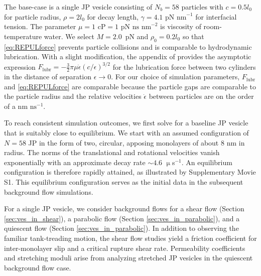 \documentclass[lineno]{jfm}
\begin{document}
The base-case is a single JP vesicle consisting of $N_b = 58$ particles
with $c = 0.5 l_0$ for particle radius, $\rho = 2 l_0$ for decay length,
$\gamma = \text{4.1 pN nm}^{-1}$ for interfacial tension.
The parameter $\mu = \text{1 cP} = \text{1 pN
ns nm}^{-2}$ is viscosity of room-temperature water. 
We select $M=2.0$~$\text{pN}$ and $\rho_0 = 0.2l_0$ so that \eqref{eq:REPULforce}
  prevents particle collisions and is comparable to hydrodynamic lubrication.
  With a slight modification, the appendix of
  \cite{cawthorn_balmforth_2010} provides the asymptotic expression 
  $F_{\text{lubr}} = -\tfrac{3}{2}\pi \mu \dot \epsilon (c/\epsilon)^{3/2}$
  for the lubrication force between two cylinders in the distance of separation $\epsilon \to 0$.
  For our choice of simulation parameters, $F_{\text{lubr}}$ and \eqref{eq:REPULforce} are comparable
  because the particle gaps are comparable to the particle radius
  and the relative velocities $\dot \epsilon$ between particles are on
  the order of a nm $\text{ns}^{-1}$.



To reach consistent simulation outcomes, we first solve for a baseline
JP vesicle that is suitably close to equilibrium. We
start with an assumed configuration of $N=58$ JP in the form of two,
circular, apposing monolayers of about $8$ nm in radius. The norms of
the translational and rotational velocities vanish exponentially with an
approximate decay rate $\sim 4.6$ $\upmu$s$^{-1}$. An equilibrium
configuration is therefore rapidly attained, as illustrated by Supplementary Movie S1. 
This equilibrium
configuration serves as the initial data in the subsequent background
flow simulations.

For a single JP vesicle, we consider background flows for a shear flow 
(Section \ref{sec:ves_in_shear}), 
a parabolic flow (Section \ref{sec:ves_in_parabolic}),
and a quiescent flow (Section \ref{sec:ves_in_parabolic}). 
In addition to observing the familiar tank-treading motion, the shear
flow studies yield a friction coefficient for inter-monolayer slip 
and a critical rupture shear rate.  Permeability coefficients and 
stretching moduli arise from analyzing stretched JP vesicles in the 
quiescent background flow case.  
 
\end{document}
